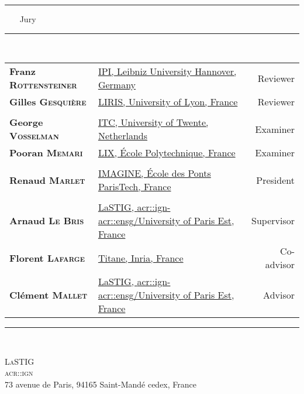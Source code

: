 \begin{titlepage}
\begin{center}
        \rule{.43\textwidth}{1pt} ~~~ {\Large Jury} ~~~ \rule{.43\textwidth}{1pt}\\
        \vspace*{1em}
        \begin{tabular}{l >{\small}x{.51\textwidth} r}
            \textbf{Franz \textsc{Rottensteiner}} & \href{https://www.ipi.uni-hannover.de/en/rottensteiner/}{IPI, Leibniz University Hannover, Germany} & Reviewer \\
            \textbf{Gilles \textsc{Gesquière}} & \href{https://perso.liris.cnrs.fr/gilles.gesquiere/wiki/doku.php}{LIRIS, University of Lyon, France} & Reviewer \\
             & & \\
            \textbf{George \textsc{Vosselman}} & \href{https://research.utwente.nl/en/persons/george-vosselman}{ITC, University of Twente, Netherlands} & Examiner \\
            \textbf{Pooran \textsc{Memari}} & \href{http://www.lix.polytechnique.fr/~memari/}{LIX, \'Ecole Polytechnique, France} & Examiner \\
             & & \\
            \textbf{Renaud \textsc{Marlet}} & \href{http://imagine.enpc.fr/~marletr/}{IMAGINE, \'Ecole des Ponts ParisTech, France} & President \\
             & & \\
            \textbf{Arnaud \textsc{Le Bris}} & \href{http://recherche.ign.fr/labos/matis/~Le_Bris}{LaSTIG, \acrshort*{acr::ign}-\acrshort*{acr::ensg}/University of Paris Est, France} & Supervisor \\
            \textbf{Florent \textsc{Lafarge}} & \href{https://www-sop.inria.fr/members/Florent.Lafarge/}{Titane, Inria, France} & Co-advisor \\
            \textbf{Clément \textsc{Mallet}} & \href{http://recherche.ign.fr/labos/matis/~mallet}{LaSTIG, \acrshort*{acr::ign}-\acrshort*{acr::ensg}/University of Paris Est, France} & Advisor \\
        \end{tabular}
        \vspace*{1em}
        \rule{\textwidth}{1pt}\\

        \vspace*{10mm}

        \begin{minipage}{.75\textwidth}
            \centering
            \small
            \textsc{LaSTIG\\ \acrfull*{acr::ign}}\\
            73 avenue de Paris, 94165 Saint-Mandé cedex, France
        \end{minipage}
    \end{center}
\end{titlepage}

